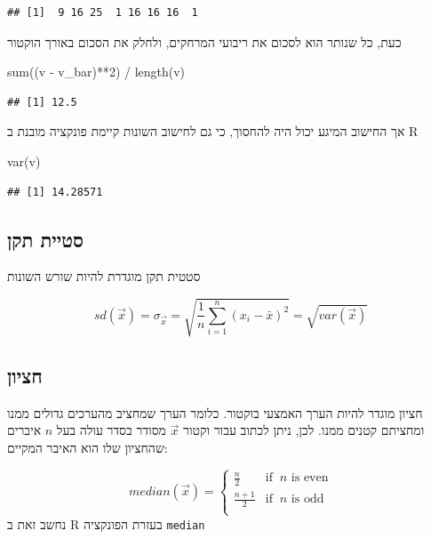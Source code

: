 \documentclass[
]{book}
\newenvironment{Shaded}{\begin{snugshade}}{\end{snugshade}}
\newcommand{\DecValTok}[1]{\textcolor[rgb]{0.00,0.00,0.81}{#1}}
\newcommand{\FunctionTok}[1]{\textcolor[rgb]{0.00,0.00,0.00}{#1}}
\newcommand{\NormalTok}[1]{#1}
\newcommand{\SpecialCharTok}[1]{\textcolor[rgb]{0.00,0.00,0.00}{#1}}
\begin{document}
\begin{verbatim}
## [1]  9 16 25  1 16 16 16  1
\end{verbatim}

כעת, כל שנותר הוא לסכום את ריבועי המרחקים, ולחלק את הסכום באורך הוקטור

\begin{Shaded}
\begin{Highlighting}[]
\FunctionTok{sum}\NormalTok{((v }\SpecialCharTok{{-}}\NormalTok{ v\_bar)}\SpecialCharTok{**}\DecValTok{2}\NormalTok{) }\SpecialCharTok{/} \FunctionTok{length}\NormalTok{(v)}
\end{Highlighting}
\end{Shaded}

\begin{verbatim}
## [1] 12.5
\end{verbatim}

אך החישוב המיגע יכול היה להחסוך, כי גם לחישוב השונות קיימת פונקציה מובנת ב
R

\begin{Shaded}
\begin{Highlighting}[]
\FunctionTok{var}\NormalTok{(v)}
\end{Highlighting}
\end{Shaded}

\begin{verbatim}
## [1] 14.28571
\end{verbatim}

\hypertarget{ux5e1ux5d8ux5d9ux5d9ux5ea-ux5eaux5e7ux5df}{%
\subsection{סטיית תקן}\label{ux5e1ux5d8ux5d9ux5d9ux5ea-ux5eaux5e7ux5df}}

סטטית תקן מוגדרת להיות שורש השונות

\[
sd(\vec x) = \sigma_{\vec x} =
\sqrt{ \frac{1}{n} \sum_{i = 1}^n (x_i - \bar x)^2 } = 
\sqrt{var(\vec x)}
\]

\hypertarget{ux5d7ux5e6ux5d9ux5d5ux5df}{%
\subsection{חציון}\label{ux5d7ux5e6ux5d9ux5d5ux5df}}

חציון מוגדר להיות הערך האמצעי בוקטור. כלומר הערך שמחציב מהערכים גדולים ממנו ומחציתם קטנים ממנו.
לכן, ניתן לכתוב עבור וקטור
\(\vec x\)
מסודר בסדר עולה
בעל
\(n\)
איברים
שהחציון שלו הוא האיבר המקיים:

\[
median(\vec x) = 
    \begin{cases}
      \frac{n}{2} & \text{if }\ n \text{ is even}\\
      \frac{n+1}{2} & \text{if }\ n \text{ is odd}\\
    \end{cases}
\]
נחשב זאת ב
R
בעזרת הפונקציה
\texttt{median}
\end{document}
